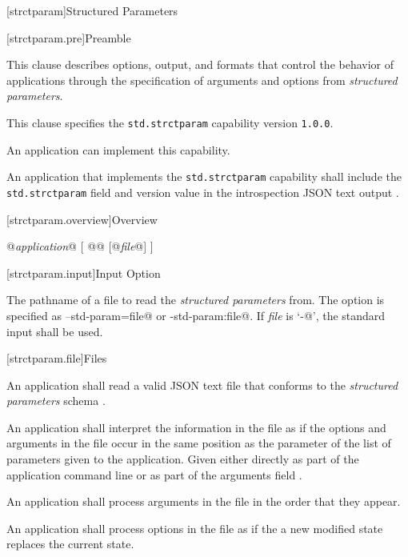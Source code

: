 
[strctparam]{Structured Parameters}


[strctparam.pre]{Preamble}

\pnum
This clause describes options, output, and formats that control the behavior of
applications through the specification of arguments and options from
\emph{structured parameters}.

\pnum
This clause specifies the \verb|std.strctparam| capability 
version \verb|1.0.0|.

\pnum
An application can implement this capability.

\pnum
An application that implements the \verb|std.strctparam| capability shall
include the \verb|std.strctparam| field and version value in the introspection
JSON text output .

[strctparam.overview]{Overview}

\pnum
\begin{outputblock}
@\emph{application}@ [ @@ [@\emph{file}@] ]
\end{outputblock}

[strctparam.input]{Input Option}

\pnum
{}
\begin{indented}
	The pathname of a file to read the \emph{structured parameters} from. The
	option is specified as \verb@--std-param=file@ or \verb@-std-param:file@. If
	\emph{file} is ‘\verb@-@’, the standard input shall be used.
\end{indented}

[strctparam.file]{Files}

\pnum
An application shall read a valid JSON text file that conforms to the
\emph{structured parameters} schema .

\pnum
An application shall interpret the information in the file as if the options
and arguments in the file occur in the same position as the
 parameter of the list of parameters given to
the application. Given either directly as part of the application command line
or as part of the arguments field .

\pnum
An application shall process arguments in the file in the order that they 
appear.

\pnum
An application shall process options in the file as if the a new modified state
replaces the current state.

